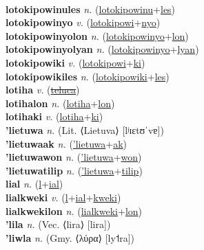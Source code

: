  \label{lotokipowinu} \\
\textbf{lotokipowinules} \textit{n.} (\hyperref[lotokipowinu]{lotokipowinu}+\hyperref[les]{les})
 \label{lotokipowinules} \\
\textbf{lotokipowinyo} \textit{v.} (\hyperref[lotokipowi]{lotokipowi}+\hyperref[nyo]{nyo})
 \label{lotokipowinyo} \\
\textbf{lotokipowinyolon} \textit{n.} (\hyperref[lotokipowinyo]{lotokipowinyo}+\hyperref[lon]{lon})
 \label{lotokipowinyolon} \\
\textbf{lotokipowinyolyan} \textit{n.} (\hyperref[lotokipowinyo]{lotokipowinyo}+\hyperref[lyan]{lyan})
 \label{lotokipowinyolyan} \\
\textbf{lotokipowiki} \textit{v.} (\hyperref[lotokipowi]{lotokipowi}+\hyperref[ki]{ki})
 \label{lotokipowiki} \\
\textbf{lotokipowikiles} \textit{n.} (\hyperref[lotokipowiki]{lotokipowiki}+\hyperref[les]{les})
 \label{lotokipowikiles} \\
\textbf{lotiha} \textit{v.} (\hyperref[teluca]{\sout{teluca}})
 \label{lotiha} \\
\textbf{lotihalon} \textit{n.} (\hyperref[lotiha]{lotiha}+\hyperref[lon]{lon})
 \label{lotihalon} \\
\textbf{lotihaki} \textit{v.} (\hyperref[lotiha]{lotiha}+\hyperref[ki]{ki})
 \label{lotihaki} \\
\textbf{'lietuwa} \textit{n.} (Lit. ⟨Lietuva⟩ [lʲɪɛtʊˈvɐ])
 \label{'lietuwa} \\
\textbf{'lietuwaak} \textit{n.} (\hyperref['lietuwa]{'lietuwa}+\hyperref[ak]{ak})
 \label{'lietuwaak} \\
\textbf{'lietuwawon} \textit{n.} (\hyperref['lietuwa]{'lietuwa}+\hyperref[won]{won})
 \label{'lietuwawon} \\
\textbf{'lietuwatilip} \textit{n.} (\hyperref['lietuwa]{'lietuwa}+\hyperref[tilip]{tilip})
 \label{'lietuwatilip} \\
\textbf{lial} \textit{n.} (\hyperref[l]{l}+\hyperref[ial]{ial})
 \label{lial} \\
\textbf{lialkweki} \textit{v.} (\hyperref[l]{l}+\hyperref[ial]{ial}+\hyperref[kweki]{kweki})
 \label{lialkweki} \\
\textbf{lialkwekilon} \textit{n.} (\hyperref[lialkweki]{lialkweki}+\hyperref[lon]{lon})
 \label{lialkwekilon} \\
\textbf{'lila} \textit{n.} (Vec. ⟨lira⟩ [lira])
 \label{'lila} \\
\textbf{'liwla} \textit{n.} (Gmy. ⟨λύρα⟩ [ly˦ra])
